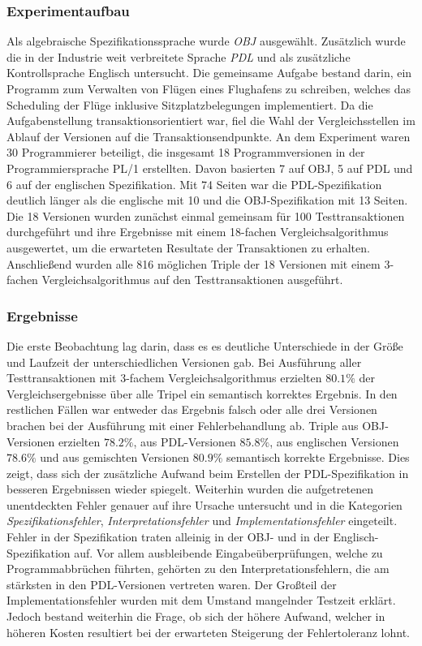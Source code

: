 \subsubsection{Experimentaufbau}\label{ucla-experiment}{
Als algebraische Spezifikationssprache wurde \emph{OBJ} ausgewählt. Zusätzlich wurde die in der Industrie weit verbreitete Sprache \emph{PDL} und als zusätzliche Kontrollsprache Englisch untersucht.
Die gemeinsame Aufgabe bestand darin, ein Programm zum Verwalten von Flügen eines Flughafens zu schreiben, welches das Scheduling der Flüge inklusive Sitzplatzbelegungen implementiert.
Da die Aufgabenstellung transaktionsorientiert war, fiel die Wahl der Vergleichsstellen im Ablauf der Versionen auf die Transaktionsendpunkte.
An dem Experiment waren 30 Programmierer beteiligt, die insgesamt 18 Programmversionen in der Programmiersprache PL/1 erstellten.
Davon basierten 7 auf OBJ, 5 auf PDL und 6 auf der englischen Spezifikation.
Mit 74 Seiten war die PDL-Spezifikation deutlich länger als die englische mit 10 und die OBJ-Spezifikation mit 13 Seiten.
Die 18 Versionen wurden zunächst einmal gemeinsam für 100 Testtransaktionen durchgeführt und ihre Ergebnisse mit einem 18-fachen Vergleichsalgorithmus ausgewertet, um die erwarteten Resultate der Transaktionen zu erhalten.
Anschließend wurden alle 816 möglichen Triple der 18 Versionen mit einem 3-fachen Vergleichsalgorithmus auf den Testtransaktionen ausgeführt.
%
\subsubsection{Ergebnisse}
%
Die erste Beobachtung lag darin, dass es es deutliche Unterschiede in der Größe und Laufzeit der unterschiedlichen Versionen gab.
Bei Ausführung aller Testtransaktionen mit 3-fachem Vergleichsalgorithmus erzielten $80.1\%$ der Vergleichsergebnisse über alle Tripel ein semantisch korrektes Ergebnis.
In den restlichen Fällen war entweder das Ergebnis falsch oder alle drei Versionen brachen bei der Ausführung mit einer Fehlerbehandlung ab.
Triple aus OBJ-Versionen erzielten $78.2\%$, aus PDL-Versionen $85.8\%$, aus englischen Versionen $78.6\%$ und aus gemischten Versionen $80.9\%$ semantisch korrekte Ergebnisse. 
Dies zeigt, dass sich der zusätzliche Aufwand beim Erstellen der PDL-Spezifikation in besseren Ergebnissen wieder spiegelt.
Weiterhin wurden die aufgetretenen unentdeckten Fehler genauer auf ihre Ursache untersucht und in die Kategorien \emph{Spezifikationsfehler}, \emph{Interpretationsfehler} und \emph{Implementationsfehler} eingeteilt.
Fehler in der Spezifikation traten alleinig in der OBJ- und in der Englisch-Spezifikation auf.
Vor allem ausbleibende Eingabeüberprüfungen, welche zu Programmabbrüchen führten, gehörten zu den Interpretationsfehlern, die am stärksten in den PDL-Versionen vertreten waren.
Der Großteil der Implementationsfehler wurden mit dem Umstand mangelnder Testzeit erklärt.
Jedoch bestand weiterhin die Frage, ob sich der höhere Aufwand, welcher in höheren Kosten resultiert bei der erwarteten Steigerung der Fehlertoleranz lohnt.

}
